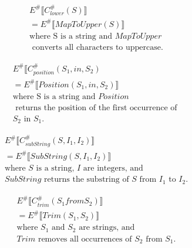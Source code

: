 \begin{align*}
    E^\# \llbracket C_{lower}^\# (S) \rrbracket \\
    = E^\# \llbracket MapToUpper (S) \rrbracket \\
    \text{where S is a string and } MapToUpper \\ 
    \text{ converts all characters to uppercase.}
\end{align*}

\begin{align*}
    E^\# \llbracket C_{position}^\# (S_1, in, S_2) \\
    = E^\# \llbracket Position(S_1, in, S_2) \rrbracket \\
    \text{where S is a string and } Position \\
    \text{ returns the position of the first occurrence of } \\
    S_2 \text{ in } S_1.
\end{align*}

\begin{align*}
    E^\# \llbracket C_{subString}^\# (S, I_1, I_2) \rrbracket \\
    = E^\# \llbracket SubString(S, I_1, I_2) \rrbracket \\
    \text{where } S \text{ is a string, } I \text{ are integers, and } \\
    SubString \text{ returns the substring of } S \text{ from } I_1 \text{ to } I_2.
\end{align*}

\begin{align*}
    E^\# \llbracket C_{trim}^\# (S_1 from S_2) \rrbracket \\
    = E^\# \llbracket Trim(S_1, S_2) \rrbracket \\
    \text{where } S_1 \text{ and } S_2 \text{ are strings, and }\\
    Trim \text{ removes all occurrences of } S_2 \text{ from } S_1.
\end{align*}